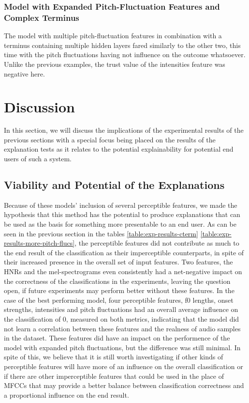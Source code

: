 \documentclass{article}
\begin{document}
		\subsubsection{Model with Expanded Pitch-Fluctuation Features and Complex Terminus}
		The model with multiple pitch-fluctuation features in combination with a terminus
		containing multiple hidden layers fared similarly to the other two, this time with the
		pitch fluctuations having not influence on the outcome whatsoever. Unlike the previous
		examples, the trust value of the intensities feature was negative here.
	\section{Discussion}
	In this section, we will discuss the implications of the experimental results of the previous
	sections with a special focus being placed on the results of the explanation tests as it
	relates to the potential explainability for potential end users of such a system.
		\subsection{Viability and Potential of the Explanations}
		Because of these models' inclusion of several perceptible features, we made the hypothesis
		that this method has the potential to produce explanations that can be used as the basis
		for something more presentable to an end user. As can be seen in the previous section in
		the tables \ref{table:exp-results-cterm} \ref{table:exp-results-more-pitch-flucs}, the
		perceptible features did not contribute as much to the end result of the classification as
		their imperceptible counterparts, in spite of their increased presence in the overall set
		of input features. Two features, the HNRs and the mel-spectrograms even consistently had a
		net-negative impact on the correctness of the classifications in the experiments, leaving
		the question open, if future experiments may perform better without these features. In the
		case of the best performing model, four perceptible features, f0 lengths, onset strengths,
		intensities and pitch fluctuations had an overall average influence on the classification
		of 0, measured on both metrics, indicating that the model did not learn a correlation
		between these features and the realness of audio samples in the dataset. These features
		did have an impact on the performence of the model with expanded pitch fluctuations, but
		the difference was still minimal. In spite of this, we believe that it is still worth
		investigating if other kinds of perceptible features will have more of an influence on the
		overall classification or if there are other imperceptible features that could be used in
		the place of MFCCs that may provide a better balance between classification correctness
		and a proportional influence on the end result.
\end{document}
